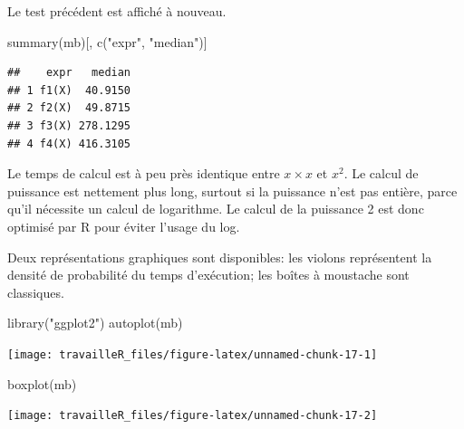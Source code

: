 \documentclass[
  11pt,
  french,
  a4paper,
  extrafontsizes,onecolumn,openright
  ]{memoir}
\newenvironment{Shaded}{\begin{snugshade}}{\end{snugshade}}
\newcommand{\FunctionTok}[1]{\textcolor[rgb]{0.00,0.00,0.00}{#1}}
\newcommand{\NormalTok}[1]{#1}
\newcommand{\StringTok}[1]{\textcolor[rgb]{0.31,0.60,0.02}{#1}}
\begin{document}
\normalsize

Le test précédent est affiché à nouveau.

\scriptsize

\begin{Shaded}
\begin{Highlighting}[]
\FunctionTok{summary}\NormalTok{(mb)[, }\FunctionTok{c}\NormalTok{(}\StringTok{"expr"}\NormalTok{, }\StringTok{"median"}\NormalTok{)]}
\end{Highlighting}
\end{Shaded}

\begin{verbatim}
##    expr   median
## 1 f1(X)  40.9150
## 2 f2(X)  49.8715
## 3 f3(X) 278.1295
## 4 f4(X) 416.3105
\end{verbatim}

\normalsize

Le temps de calcul est à peu près identique entre \(x \times x\) et \(x^2\).
Le calcul de puissance est nettement plus long, surtout si la puissance n'est pas entière, parce qu'il nécessite un calcul de logarithme.
Le calcul de la puissance 2 est donc optimisé par R pour éviter l'usage du log.

Deux représentations graphiques sont disponibles: les violons représentent la densité de probabilité du temps d'exécution; les boîtes à moustache sont classiques.

\scriptsize

\begin{Shaded}
\begin{Highlighting}[]
\FunctionTok{library}\NormalTok{(}\StringTok{"ggplot2"}\NormalTok{)}
\FunctionTok{autoplot}\NormalTok{(mb)}
\end{Highlighting}
\end{Shaded}

\begin{center}\texttt{[image: travailleR\_files/figure-latex/unnamed-chunk-17-1]} \end{center}

\begin{Shaded}
\begin{Highlighting}[]
\FunctionTok{boxplot}\NormalTok{(mb)}
\end{Highlighting}
\end{Shaded}

\begin{center}\texttt{[image: travailleR\_files/figure-latex/unnamed-chunk-17-2]} \end{center}
\end{document}
